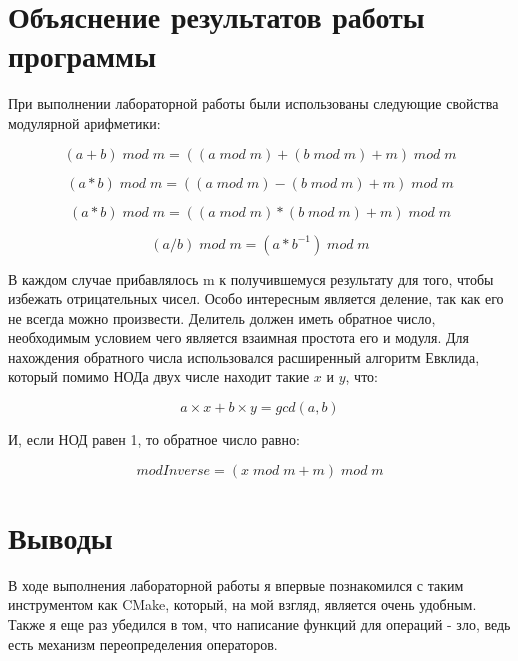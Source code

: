 \documentclass[a4paper, 12pt]{article}
\begin{document}
\newpage

\section{Объяснение результатов работы программы}

При выполнении лабораторной работы были использованы следующие свойства модулярной арифметики:

\[ (a + b)\;mod\;m = ((a\;mod\;m)+(b\;mod\;m) + m)\;mod\;m \]

\[ (a * b)\;mod\;m = ((a\;mod\;m)-(b\;mod\;m) + m)\;mod\;m \]

\[ (a * b)\;mod\;m = ((a\;mod\;m)*(b\;mod\;m) + m)\;mod\;m \]

\[ (a / b)\;mod\;m = (a*b^{-1})\;mod\;m \]

В каждом случае прибавлялось m к получившемуся результату для того, чтобы избежать отрицательных чисел. Особо интересным является деление, так как его не всегда можно произвести. Делитель должен иметь обратное число, необходимым условием чего является взаимная простота его и модуля. Для нахождения обратного числа использовался расширенный алгоритм Евклида, который помимо НОДа двух числе находит такие $ x $  и $ y $, что:

\[ a \times x + b\times y = gcd(a,b) \]

И, если НОД равен 1, то обратное число равно:

\[ modInverse = (x\;mod\;m + m)\;mod\;m \]

\newpage
\section{Выводы}

В ходе выполнения лабораторной работы я впервые познакомился с таким инструментом как CMake, который, на мой взгляд, является очень удобным. Также я еще раз убедился в том, что написание функций для операций - зло, ведь есть механизм переопределения операторов.
\end{document}
